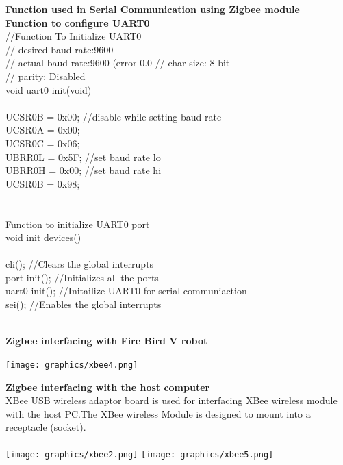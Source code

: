 \documentclass[report]{res}
\begin{document}
	\textbf{\large Function used in Serial Communication using Zigbee module} \\
	
	\textbf{\large Function to configure UART0} \\
	//Function To Initialize UART0  \\
	// desired baud rate:9600  \\
	// actual baud rate:9600 (error 0.0%
	// char size: 8 bit  \\
	// parity: Disabled  \\
	void uart0 init(void)  \\
	{  \\
		UCSR0B = 0x00; //disable while setting baud rate  \\
		UCSR0A = 0x00;  \\
		UCSR0C = 0x06;  \\
		UBRR0L = 0x5F; //set baud rate lo  \\
		UBRR0H = 0x00; //set baud rate hi  \\
		UCSR0B = 0x98;  \\
	}  \\ \\
	Function to initialize UART0 port \\
	void init devices() \\
	{ \\
		cli(); //Clears the global interrupts \\
		port init();  //Initializes all the ports \\
		uart0 init(); //Initailize UART0 for serial communiaction \\
		sei();   //Enables the global interrupts \\
	}  \\
	
	\pagebreak
	
	\textbf{\large Zigbee interfacing with Fire Bird V robot} \\
	\begin{center}
			\texttt{[image: graphics/xbee4.png]}\\		
	\end{center}
	
	\textbf{\large Zigbee interfacing with the host computer} \\
	XBee USB wireless adaptor board is used for interfacing XBee wireless module with the host PC.The XBee wireless Module is designed to mount into a receptacle (socket).\\ \\
	\texttt{[image: graphics/xbee2.png]}
	\texttt{[image: graphics/xbee5.png]}\\
	
\end{document}
